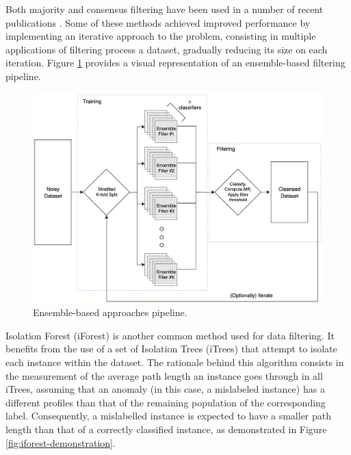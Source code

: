 \documentclass[12pt, english, openany]{book}
\begin{document}
Both majority and consensus filtering have been used in a number of recent
publications \cite{Garcia-Gil2019, Boukir2019, Pelletier2017Filtering,
Zhang2018, Yuan2018}. Some of these methods \cite{Boukir2019, Yuan2018}
achieved improved performance by implementing an iterative approach to the
problem, consisting in multiple applications of filtering process a dataset,
gradually reducing its size on each iteration. Figure
\ref{fig:ensemble-filter-pipeline} provides a visual representation of an
ensemble-based filtering pipeline.

\begin{figure}[H]
	\centering
	\includegraphics[width=1\linewidth]{enfilter_pipeline.png}
  \caption{Ensemble-based approaches pipeline.}
  \label{fig:ensemble-filter-pipeline}
\end{figure}

Isolation Forest (iForest) \cite{Liu2008} is another common method used for
data filtering. It benefits from the use of a set of Isolation Trees (iTrees)
that attempt to isolate each instance within the dataset. The rationale behind
this algorithm consists in the measurement of the average path length an
instance goes through in all iTrees, assuming that an anomaly (in this case, a
mislabeled instance) has a different profiles than that of the remaining
population of the corresponding label. Consequently, a mislabelled instance is
expected to have a smaller path length than that of a correctly classified
instance, as demonstrated in Figure \ref{fig:iforest-demonstration}.
\end{document}
